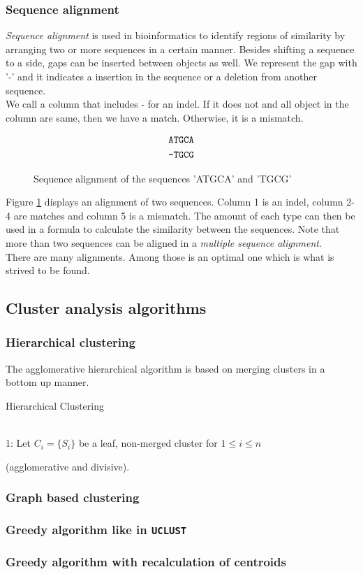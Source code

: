 \subsubsection{Sequence alignment}
\emph{Sequence alignment} is used in bioinformatics to identify regions of
similarity by arranging two or more sequences in a certain manner. Besides
shifting a sequence to a side, gaps can be inserted between objects as well. We
represent the gap with '-' and it indicates a insertion in the sequence or a
deletion from another sequence.\\
We call a column that includes - for an indel. If it does not and all object in
the column are same, then we have a match. Otherwise, it is a mismatch.\\
\begin{figure}[h!]
  \centering
  	  \begin{align*}
  	  	\mbox{\texttt{ATGCA}} \\
      	\mbox{\texttt{-TGCG}}
  	  \end{align*}
  \caption{Sequence alignment of the sequences 'ATGCA' and 'TGCG'}
  \label{fig:seqAlignment}
\end{figure}
Figure \ref{fig:seqAlignment} displays an alignment of two sequences. Column 1
is an indel, column 2-4 are matches and column 5 is a mismatch. The amount of
each type can then be used in a formula to calculate the similarity between the
sequences. Note that more than two sequences can be aligned in a \emph{multiple
sequence alignment}. \\
There are many alignments. Among those is an optimal one which is what is
strived to be found.

\subsection{Cluster analysis algorithms}

\subsubsection{Hierarchical clustering}
The agglomerative hierarchical algorithm is based on merging clusters in a bottom up manner.
\begin{algorithm}
\caption{Hierarchical Clustering}
\label{hierarchicalCluster}
\begin{algorithmic}
 \\
1: Let $C_i=\{S_i\}$ be a leaf, non-merged cluster for $1\leq i\leq n$
\EndFunction
\end{algorithmic}
\end{algorithm}


(agglomerative and divisive).

\subsubsection{Graph based clustering}


\subsubsection{Greedy algorithm like in \texttt{UCLUST}} 


\subsubsection{Greedy algorithm with recalculation of centroids}

